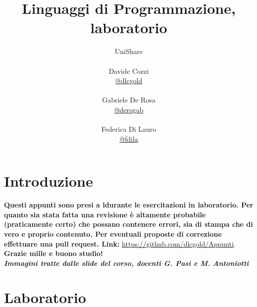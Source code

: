 \documentclass[a4paper,12pt, oneside]{book}
\title{Linguaggi di Programmazione, laboratorio}
\author{UniShare\\\\Davide Cozzi\\\href{https://t.me/dlcgold}{@dlcgold}\\\\Gabriele De Rosa\\\href{https://t.me/derogab}{@derogab} \\\\Federica Di Lauro\\\href{https://t.me/f_dila}{@f\textunderscore dila}}
\date{}
\begin{document}
\maketitle


\newtheorem{teorema}{Teorema}
\newtheorem{definizione}{Definizione}
\newtheorem{esempio}{Esempio}
\newtheorem{corollario}{Corollario}
\newtheorem{lemma}{Lemma}
\newtheorem{osservazione}{Osservazione}
\newtheorem{nota}{Nota}
\newtheorem{esercizio}{Esercizio}
\tableofcontents
\renewcommand{\chaptermark}[1]{%
\markboth{\chaptername
\ \thechapter.\ #1}{}}
\renewcommand{\sectionmark}[1]{\markright{\thesection.\ #1}}
\chapter{Introduzione}
\textbf{Questi appunti sono presi a ldurante le esercitazioni in laboratorio. Per quanto sia stata fatta una revisione è altamente probabile (praticamente certo) che possano contenere errori, sia di stampa che di vero e proprio contenuto. Per eventuali proposte di correzione effettuare una pull request. Link: } \url{https://github.com/dlcgold/Appunti}.\\
\textbf{Grazie mille e buono studio!}\\
\textbf{\textit{Immagini tratte dalle slide del corso, docenti G. Pasi
  e M. Antoniotti}}
\chapter{Laboratorio}
\end{document}
